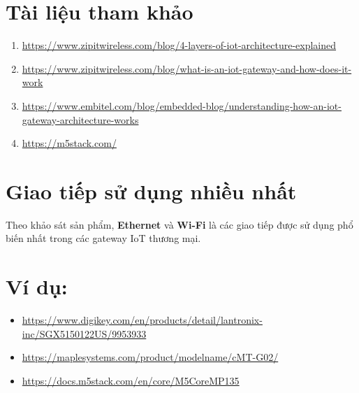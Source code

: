 \section*{Tài liệu tham khảo}
\begin{enumerate}
    \item \url{https://www.zipitwireless.com/blog/4-layers-of-iot-architecture-explained}
    \item \url{https://www.zipitwireless.com/blog/what-is-an-iot-gateway-and-how-does-it-work}
    \item \url{https://www.embitel.com/blog/embedded-blog/understanding-how-an-iot-gateway-architecture-works}
    \item \url{https://m5stack.com/}
\end{enumerate}

\section*{Giao tiếp sử dụng nhiều nhất}
Theo khảo sát sản phẩm, \textbf{Ethernet} và \textbf{Wi-Fi} là các giao tiếp được sử dụng phổ biến nhất trong các gateway IoT thương mại.

\section*{Ví dụ:}
\begin{itemize}
    \item \url{https://www.digikey.com/en/products/detail/lantronix-inc/SGX5150122US/9953933}
    \item \url{https://maplesystems.com/product/modelname/cMT-G02/}
    \item \url{https://docs.m5stack.com/en/core/M5CoreMP135}
\end{itemize}

